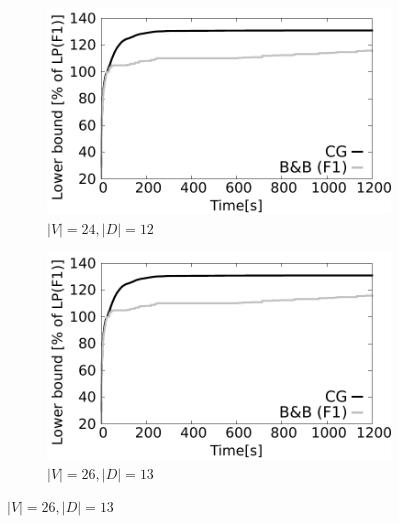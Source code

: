 \begin{figure}[!htb]
    \centering
    \begin{subfigure}[b]{0.49\textwidth}
        \includegraphics[width=\textwidth]{lower-bound-24-12}
        \caption{$|V|=24, |D|=12$}
        \label{fig:cggr24-12}
    \end{subfigure}
    \hfill %
    \begin{subfigure}[b]{0.49\textwidth}
        \includegraphics[width=\textwidth]{lower-bound-26-13}
        \caption{$|V|=26, |D|=13$}
        \label{fig:cggr26-13}
    \end{subfigure}
  

\end{figure}
